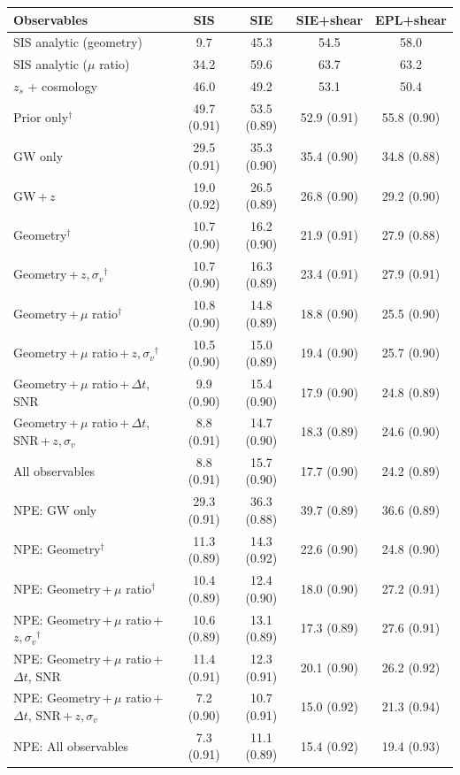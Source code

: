 \begin{tabular*}{\linewidth}{@{\extracolsep{\fill}}lcccc@{}}
\toprule
Observables & SIS & SIE & SIE+shear & EPL+shear \\
\midrule
SIS analytic (geometry) & 9.7 & 45.3 & 54.5 & 58.0 \\
SIS analytic ($\mu$ ratio) & 34.2 & 59.6 & 63.7 & 63.2 \\
$z_s$ + cosmology & 46.0 & 49.2 & 53.1 & 50.4 \\
\midrule
Prior only$^\dagger$ & 49.7 (0.91) & 53.5 (0.89) & 52.9 (0.91) & 55.8 (0.90) \\
GW only & 29.5 (0.91) & 35.3 (0.90) & 35.4 (0.90) & 34.8 (0.88) \\
GW\,+\,$z$ & 19.0 (0.92) & 26.5 (0.89) & 26.8 (0.90) & 29.2 (0.90) \\
Geometry$^\dagger$ & 10.7 (0.90) & 16.2 (0.90) & 21.9 (0.91) & 27.9 (0.88) \\
Geometry\,+\,$z,\sigma_v$$^\dagger$ & 10.7 (0.90) & 16.3 (0.89) & 23.4 (0.91) & 27.9 (0.91) \\
Geometry\,+\,$\mu$ ratio$^\dagger$ & 10.8 (0.90) & 14.8 (0.89) & 18.8 (0.90) & 25.5 (0.90) \\
Geometry\,+\,$\mu$ ratio\,+\,$z,\sigma_v$$^\dagger$ & 10.5 (0.90) & 15.0 (0.89) & 19.4 (0.90) & 25.7 (0.90) \\
Geometry\,+\,$\mu$ ratio\,+\,$\Delta t$, SNR & 9.9 (0.90) & 15.4 (0.90) & 17.9 (0.90) & 24.8 (0.89) \\
Geometry\,+\,$\mu$ ratio\,+\,$\Delta t$, SNR\,+\,$z,\sigma_v$ & 8.8 (0.91) & 14.7 (0.90) & 18.3 (0.89) & 24.6 (0.90) \\
All observables & 8.8 (0.91) & 15.7 (0.90) & 17.7 (0.90) & 24.2 (0.89) \\
\midrule
NPE: GW only & 29.3 (0.91) & 36.3 (0.88) & 39.7 (0.89) & 36.6 (0.89) \\
NPE: Geometry$^\dagger$ & 11.3 (0.89) & 14.3 (0.92) & 22.6 (0.90) & 24.8 (0.90) \\
NPE: Geometry\,+\,$\mu$ ratio$^\dagger$ & 10.4 (0.89) & 12.4 (0.90) & 18.0 (0.90) & 27.2 (0.91) \\
NPE: Geometry\,+\,$\mu$ ratio\,+\,$z,\sigma_v$$^\dagger$ & 10.6 (0.89) & 13.1 (0.89) & 17.3 (0.89) & 27.6 (0.91) \\
NPE: Geometry\,+\,$\mu$ ratio\,+\,$\Delta t$, SNR & 11.4 (0.91) & 12.3 (0.91) & 20.1 (0.90) & 26.2 (0.92) \\
NPE: Geometry\,+\,$\mu$ ratio\,+\,$\Delta t$, SNR\,+\,$z,\sigma_v$ & 7.2 (0.90) & 10.7 (0.91) & 15.0 (0.92) & 21.3 (0.94) \\
NPE: All observables & 7.3 (0.91) & 11.1 (0.89) & 15.4 (0.92) & 19.4 (0.93) \\
\bottomrule
\end{tabular*}